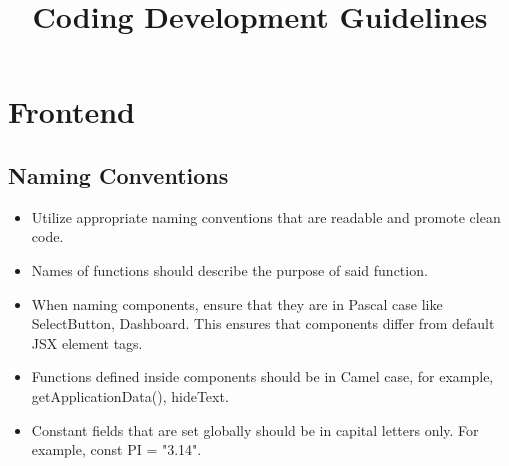 \documentclass{article}
\title{Coding Development Guidelines}
\author{}
\date{}
\begin{document}
\maketitle

\section{Frontend}
\subsection{Naming Conventions}
\begin{itemize}
    \item Utilize appropriate naming conventions that are readable and promote clean code.
    \item Names of functions should describe the purpose of said function.
    \item When naming components, ensure that they are in Pascal case like SelectButton, Dashboard. This ensures that components differ from default JSX element tags.
    \item Functions defined inside components should be in Camel case, for example, getApplicationData(), hideText.
    \item Constant fields that are set globally should be in capital letters only. For example, const PI = "3.14".
\end{itemize}
\end{document}
